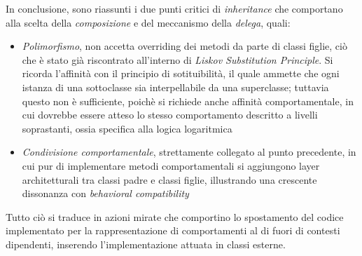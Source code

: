 \documentclass{article}
\begin{document}
In conclusione, sono riassunti i due punti critici di \textit{inheritance} che comportano alla scelta della \textit{composizione} e del meccanismo della \textit{delega}, quali:
\begin{itemize}[label={-}]
    \itemsep0em
    \item \textit{Polimorfismo}, non accetta overriding dei metodi da parte di classi figlie, ciò che è stato già riscontrato all'interno di \textit{Liskov Substitution Principle}. Si ricorda l'affinità con il principio di sotituibilità, il quale ammette che ogni istanza di una sottoclasse sia interpellabile da una superclasse; tuttavia questo non è sufficiente, poichè si richiede anche affinità comportamentale, in cui dovrebbe essere atteso lo stesso comportamento descritto a livelli soprastanti, ossia specifica alla logica logaritmica
    \item \textit{Condivisione comportamentale}, strettamente collegato al punto precedente, in cui pur di implementare metodi comportamentali si aggiungono layer architetturali tra classi padre e classi figlie, illustrando una crescente dissonanza con \textit{behavioral compatibility}
\end{itemize}
Tutto ciò si traduce in azioni mirate che comportino lo spostamento del codice implementato per la rappresentazione di comportamenti al di fuori di contesti dipendenti, inserendo l'implementazione attuata in classi esterne.
\end{document}
